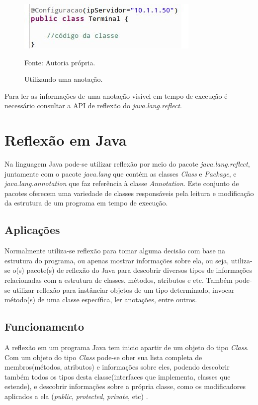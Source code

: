 \documentclass[tc,openright]{iiufrgs}
\begin{document}
\begin{figure}[ht]
	\centering
	\includegraphics[scale=0.6]{figuras/usandoAnnotation.jpg}
	\caption{Utilizando uma anotação.}
	\small{Fonte: Autoria própria.}
	\label{fig:usandoAnotacao}
\end{figure}

Para ler as informações de uma anotação visível em tempo de execução é necessário consultar a API de reflexão do \textit{java.lang.reflect}.

\section{Reflexão em Java}
Na linguagem Java pode-se utilizar reflexão por meio do pacote \textit{java.lang.reflect}, juntamente com o pacote \textit{java.lang} que contém as classes \textit{Class} e \textit{Package}, e \textit{java.lang.annotation} que faz referência à classe \textit{Annotation}. Este conjunto de pacotes oferecem uma variedade de classes responsáveis pela leitura e modificação da estrutura de um programa em tempo de execução.

\subsection{Aplicações}

Normalmente utiliza-se reflexão para tomar alguma decisão com base na estrutura do programa, ou apenas mostrar informações sobre ela, ou seja,  utiliza-se o(s) pacote(s) de reflexão do Java para descobrir diversos tipos de informações relacionadas com a estrutura de classes, métodos, atributos e etc. Também pode-se utilizar reflexão para instânciar objetos de um tipo determinado, invocar método(s) de uma classe específica, ler anotações, entre outros.

\subsection{Funcionamento}

A reflexão em um programa Java tem inicio apartir de um objeto do tipo \textit{Class}. Com um objeto do tipo \textit{Class} pode-se ober sua lista completa de membros(métodos, atributos) e informações sobre eles, podendo descobrir também todos os tipos desta classe(interfaces que implementa, classes que estende), e descobrir informações sobre a própria classe, como os modificadores aplicados a ela (\textit{public}, \textit{protected}, \textit{private}, etc) \cite{arnold2000java}.
\end{document}
